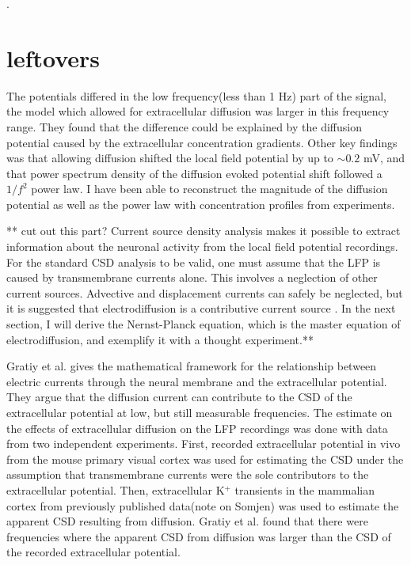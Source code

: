 \documentclass{article}
\begin{document}
. 
\section{leftovers}


The potentials differed in the low frequency(less than 1 Hz) part of the signal, the model which allowed for extracellular diffusion was larger in this frequency range. They found that the difference could be explained by the diffusion potential caused by the extracellular concentration gradients. Other key findings was that allowing diffusion shifted the local field potential by up to $\sim 0.2$ mV, and that power spectrum density of the diffusion evoked potential shift followed a $1/f^2$ power law. I have been able to reconstruct the magnitude of the diffusion potential as well as the power law with concentration profiles from experiments. 


** cut out this part?
Current source density analysis makes it possible to extract information about the neuronal activity from the local field potential recordings. For the standard CSD analysis to be valid, one must assume that the LFP is caused by transmembrane currents alone. This involves a neglection of other current sources. Advective and displacement currents can safely be neglected, but it is suggested that electrodiffusion is a contributive current source \cite{Gratiy2017}. In the next section, I will derive the Nernst-Planck equation, which is the master equation of electrodiffusion, and exemplify it with a thought experiment.**

Gratiy et al.\cite{Gratiy2017} gives the mathematical framework for the relationship between electric currents through the neural membrane and the extracellular potential. They argue that the diffusion current can contribute to the CSD of the extracellular potential at low, but still measurable frequencies. The estimate on the effects of extracellular diffusion on the LFP recordings was done with data from two independent experiments. First, recorded extracellular potential in vivo from the mouse primary visual cortex was used for estimating the CSD under the assumption that transmembrane currents were the sole contributors to the extracellular potential. Then, extracellular K$^+$ transients in the mammalian cortex from previously published data(note on Somjen) was used to estimate the apparent CSD resulting from diffusion. Gratiy et al. found that there were frequencies where the apparent CSD from diffusion was larger than the CSD of the recorded extracellular potential.
\end{document}
